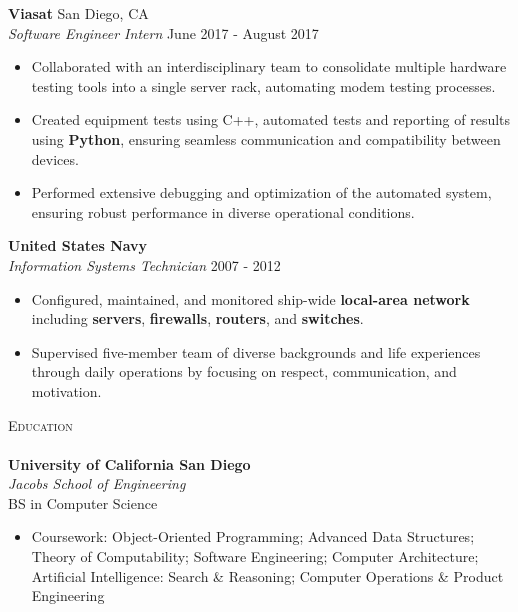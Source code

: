 \documentclass[a4paper]{article}
\newcommand{\lineunder} {
    \vspace*{-8pt} \\
    \hspace*{-18pt} \hrulefill \\
}
\newcommand{\header} [1] {
    {\hspace*{-18pt}\vspace*{6pt} \textsc{#1}}
    \vspace*{-6pt} \lineunder
}
\begin{document}
\vspace{-1mm}
\textbf{Viasat} \hfill San Diego, CA\\
\textit{Software Engineer Intern} \hfill June 2017 - August 2017\\
\vspace{-1mm}
\begin{itemize} \itemsep 1pt
    \item Collaborated with an interdisciplinary team to consolidate multiple hardware testing tools into a single server rack, automating modem testing processes.
    \item Created equipment tests using C++, automated tests and reporting of results using \textbf{Python}, ensuring seamless communication and compatibility between devices.
    \item Performed extensive debugging and optimization of the automated system, ensuring robust performance in diverse operational conditions.
\end{itemize}

\textbf{United States Navy} \hfill \\
\textit{Information Systems Technician} \hfill 2007 - 2012\\
\vspace{-1mm}
\begin{itemize} \itemsep 1pt
	\item Configured, maintained, and monitored ship-wide \textbf{local-area network} including \textbf{servers}, \textbf{firewalls}, \textbf{routers}, and \textbf{switches}.
	\item Supervised five-member team of diverse backgrounds and life experiences through daily operations by focusing on respect, communication, and motivation.
\end{itemize}

\header{Education}
\textbf{University of California San Diego}\hfill \\
\textit{Jacobs School of Engineering} \\
BS in Computer Science \hfill \\
\begin{itemize} \itemsep 1pt
	\item Coursework: Object-Oriented Programming; Advanced Data Structures; Theory of Computability; Software Engineering; Computer Architecture; Artificial Intelligence: Search \& Reasoning; Computer Operations \& Product Engineering \\
\end{itemize}

\vspace{2mm}
\end{document}
